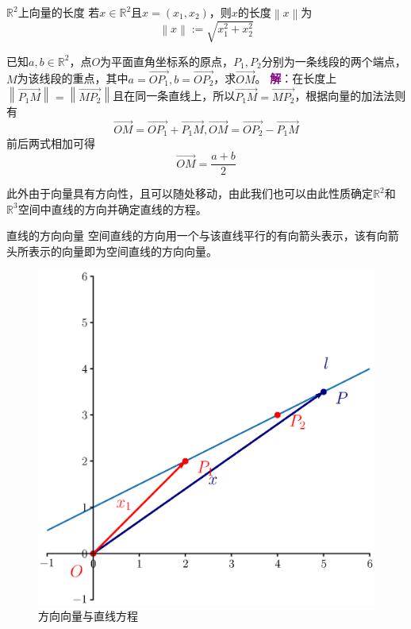 \begin{definition}{$\mathbb{R}^2$上向量的长度}
	\label{def:lengthOfVec}
	若$x\in \mathbb{R}^2$且$x=(x_1,x_2)$，则$x$的长度$\left \| x \right \| $为$$\left \| x \right \| := \sqrt{x_1^2+x_2^2}$$
\end{definition}

\begin{example}
	已知$a,b\in \mathbb{R}^2$，点$O$为平面直角坐标系的原点，$P_1,P_2$分别为一条线段的两个端点，$M$为该线段的重点，其中$a=\overrightarrow{OP_1},b=\overrightarrow{OP_2}$，求$\overrightarrow{OM}$。
	\tcblower
	\textcolor{purple}{\textbf{解}}：在长度上$\left \| \overrightarrow{P_1M} \right \|=\left \| \overrightarrow{MP_2} \right \|$且在同一条直线上，所以$\overrightarrow{P_1M}=\overrightarrow{MP_2}$，根据向量的加法法则有$$\overrightarrow{OM}=\overrightarrow{OP_1}+\overrightarrow{P_1M},\overrightarrow{OM}=\overrightarrow{OP_2}-\overrightarrow{P_1M}$$前后两式相加可得$$\overrightarrow{OM}=\frac{a+b}{2}$$
\end{example}

此外由于向量具有方向性，且可以随处移动，由此我们也可以由此性质确定$\mathbb{R}^2$和$\mathbb{R}^3$空间中直线的方向并确定直线的方程。

\begin{definition}{直线的方向向量}
	空间直线的方向用一个与该直线平行的有向箭头表示，该有向箭头所表示的向量即为空间直线的方向向量。
\end{definition}

\begin{figure}[htbp]
	\centering
	\includegraphics[width=0.7\linewidth]{figure/eps/LineAndVector2d}
	\caption{方向向量与直线方程}
	\label{fig:lineandvector2d}
\end{figure}

